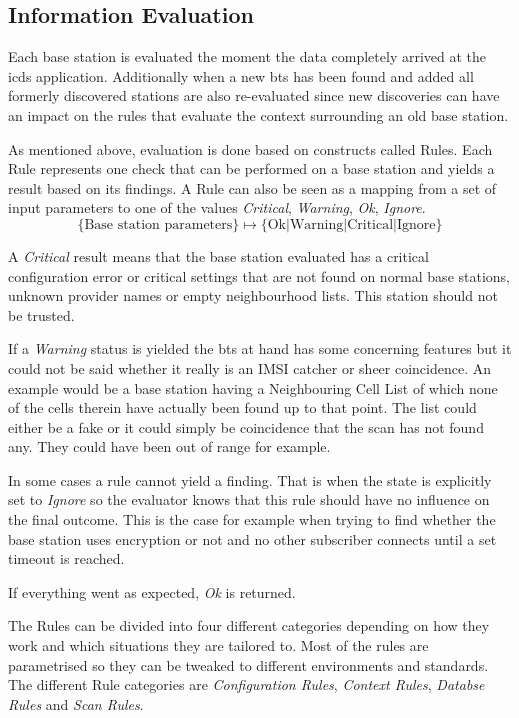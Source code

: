 \subsection{Information Evaluation}
\label{sec:info_evaluation}
Each base station is evaluated the moment the data completely arrived at the \gls{icds} application.
Additionally when a new \gls{bts} has been found and added all formerly discovered stations are also re-evaluated since new discoveries can have an impact on the rules that evaluate the context surrounding an old base station.

As mentioned above, evaluation is done based on constructs called Rules.
Each Rule represents one check that can be performed on a base station and yields a result based on its findings.
A Rule can also be seen as a mapping from a set of input parameters to one of the values \emph{Critical}, \emph{Warning}, \emph{Ok}, \emph{Ignore}.
\[\lbrace \text{Base station parameters}\rbrace \mapsto \lbrace \text{Ok}\lvert\text{Warning}\lvert\text{Critical}\lvert\text{Ignore}\rbrace\]

A \emph{Critical} result means that the base station evaluated has a critical configuration error or critical settings that are not found on normal base stations, \eg unknown provider names or empty neighbourhood lists.
This station should not be trusted.

If a \emph{Warning} status is yielded the \gls{bts} at hand has some concerning features but it could not be said whether it really is an IMSI catcher or sheer coincidence.
An example would be a base station having a  Neighbouring Cell List of which none of the cells therein have actually been found up to that point.
The list could either be a fake or it could simply be coincidence that the scan has not found any.
They could have been out of range for example.

In some cases a rule cannot yield a finding.
That is when the state is explicitly set to \emph{Ignore} so the evaluator knows that this rule should have no influence on the final outcome.	
This is the case for example when trying to find whether the base station uses encryption or not and no other subscriber connects until a set timeout is reached.

If everything went as expected, \emph{Ok} is returned.

The Rules can be divided into four different categories depending on how they work and which situations they are tailored to.
Most of the rules are parametrised so they can be tweaked to different environments and standards.
The different Rule categories are \emph{Configuration Rules}, \emph{Context Rules}, \emph{Databse Rules} and \emph{Scan Rules}.

